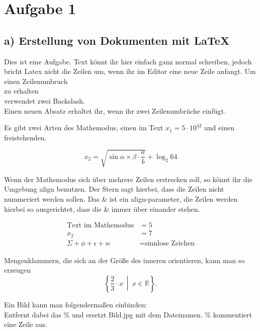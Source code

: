 \documentclass[a4paper]{scrartcl}
\begin{document}
\newpage




\section*{Aufgabe 1}
\subsection*{a) Erstellung von Dokumenten mit LaTeX}

Dies ist eine Aufgabe. Text könnt ihr hier einfach ganz normal schreiben, jedoch bricht
Latex
nicht
die
Zeilen
um, wenn ihr im Editor eine neue Zeile anfangt.
Um einen Zeilenumbruch \\
zu erhalten \\
verwendet zwei Backslash.\\
Einen neuen Absatz erhaltet ihr, wenn ihr zwei Zeilenumbrüche einfügt.

Es gibt zwei Arten des Mathemodus, einen im Text $x_1 = 5 \cdot 10^{42}$ und einen 
freistehenden.

\[x_2 = \sqrt{ \sin{ \alpha \times \beta} \cdot \frac{a}{b}} + \log_2{64}\]

Wenn der Mathemodus sich über mehrere Zeilen erstrecken soll, so könnt ihr die 
Umgebung align benutzen. Der Stern sagt hierbei, dass die Zeilen nicht nummeriert 
werden sollen. Das \& ist ein align-parameter, die Zeilen werden hierbei so ausgerichtet, 
dass die \& immer über einander stehen.

\begin{align*}
\text{Text im Mathemodus} & = 5\\
x_2 &= 7\\
\Sigma + \phi + \epsilon + w &= \text{sinnlose Zeichen}
\end{align*}

Mengenklammern, die sich an der Größe des inneren orientieren, kann man so erzeugen
\[\left\{ \frac{2}{3} \cdot x \ \middle| \ x \in \mathbb{R} \right\} .\]


Ein Bild kann man folgendermaßen einbinden: \\
Entfernt dabei das \% und ersetzt Bild.jpg mit dem Dateinamen. \% kommentiert 
eine Zeile aus.
\end{document}
